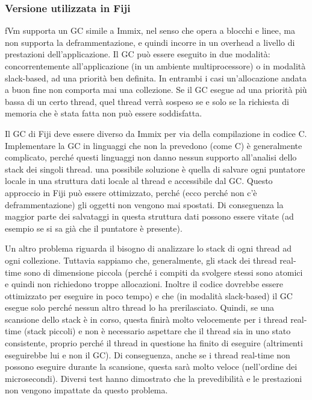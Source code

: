 

\subsubsection{Versione utilizzata in Fiji}
fVm supporta un GC simile a Immix, nel senso che opera a blocchi e linee, ma non supporta la deframmentazione, e quindi incorre in un overhead a livello di prestazioni dell'applicazione. Il GC può essere eseguito in due modalità: concorrentemente all'applicazione (in un ambiente multiprocessore) o in modalità slack-based, ad una priorità ben definita. In entrambi i casi un'allocazione andata a buon fine non comporta mai una collezione. Se il GC esegue ad una priorità più bassa di un certo thread, quel thread verrà sospeso se e solo se la richiesta di memoria che è stata fatta non può essere soddisfatta.

Il GC di Fiji deve essere diverso da Immix per via della compilazione in codice C. Implementare la GC in linguaggi che non la prevedono (come C) è generalmente complicato, perché questi linguaggi non danno nessun supporto all'analisi dello stack dei singoli thread. una possibile soluzione è quella di salvare ogni puntatore locale in una struttura dati locale al thread e accessibile dal GC. Questo approccio in Fiji può essere ottimizzato, perché (ecco perché non c'è deframmentazione) gli oggetti non vengono mai spostati. Di conseguenza la maggior parte dei salvataggi in questa struttura dati possono essere vitate (ad esempio se si sa già che il puntatore è presente). 

Un altro problema riguarda il bisogno di analizzare lo stack di ogni thread ad ogni collezione. Tuttavia sappiamo che, generalmente, gli stack dei thread real-time sono di dimensione piccola (perché i compiti da svolgere stessi sono atomici e quindi non richiedono troppe allocazioni. Inoltre il codice dovrebbe essere ottimizzato per eseguire in poco tempo) e che (in modalità slack-based) il GC esegue solo perché nessun altro thread lo ha prerilasciato. Quindi, se una scansione dello stack è in corso, questa finirà molto velocemente per i thread real-time (stack piccoli) e non è necessario aspettare che il thread sia in uno stato consistente, proprio perché il thread in questione ha finito di eseguire (altrimenti eseguirebbe lui e non il GC). Di conseguenza, anche se i thread real-time non possono eseguire durante la scansione, questa sarà molto veloce (nell'ordine dei microsecondi). Diversi test hanno dimostrato che la prevedibilità e le prestazioni non vengono impattate da questo problema.

